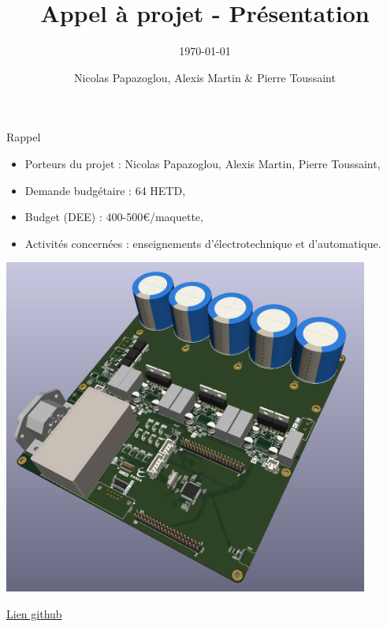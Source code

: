 \documentclass[aspectratio=169]{beamer}
\title{Appel à projet - Présentation}
\subtitle{\today}
\date{}
\author[N.P. - A.M. - P.T.]{Nicolas Papazoglou, Alexis Martin \& Pierre Toussaint}
\institute[ENSEA]{ENSEA}
\begin{document}
\begin{frame}
	\titlepage
\end{frame}

\begin{frame}{Rappel}
\begin{minipage}{0.49\textwidth}
	\begin{itemize}
		\item Porteurs du projet : Nicolas Papazoglou, Alexis Martin, Pierre Toussaint,
		\item Demande budgétaire : 64 HETD, 
		\item Budget (DEE) : 400-500\euro/maquette,
		\item Activités concernées : enseignements d'électrotechnique et d'automatique.
	\end{itemize}
\end{minipage}
\begin{minipage}{0.49\textwidth}
	\includegraphics[width=0.9\textwidth]{figures/inverter.png} 
\end{minipage}
\center \href{https://github.com/DBXYD/AAP_ENSEA_Inverter}{Lien github}
\end{frame}
\end{document}
